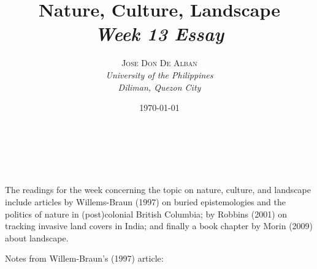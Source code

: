 \documentclass[a4paper, 10.5pt]{article} %
\title{\textbf{Nature, Culture, Landscape}\\ %
\textsl{Week 13 Essay}} %
\author{\textsc{Jose Don De Alban} %
\\{\textit{University of the Philippines} %
\\{\textit{Diliman, Quezon City}}}} %
\date{\today} %
\makeatletter
\renewcommand{\maketitle}
{
\begin{flushright} %
{\LARGE\@title} %
\vspace{40pt} %

{\large\@author} %
\\\@date %

\vspace{10pt} %
\end{flushright}
}
\makeatother
\begin{document}
\maketitle %


\section*{}

The readings for the week concerning the topic on nature, culture, and landscape include articles by Willems-Braun (1997) \cite{willemsbraun_1997} on buried epistemologies and the politics of nature in (post)colonial British Columbia; by Robbins (2001) \cite{robbins_2001} on tracking invasive land covers in India; and finally a book chapter by Morin (2009) \cite{clifford_2009} about landscape.

\vspace{10pt}

Notes from Willem-Braun's (1997) article:
\end{document}
